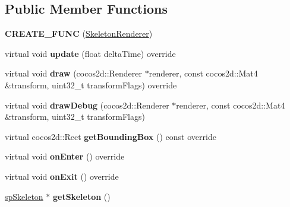 \subsection*{Public Member Functions}
\begin{DoxyCompactItemize}
\item 
\mbox{\label{classspine_1_1SkeletonRenderer_ab3f3c368717683a4967207db7c73ce16}} 
{\bfseries C\+R\+E\+A\+T\+E\+\_\+\+F\+U\+NC} (\hyperlink{classspine_1_1SkeletonRenderer}{Skeleton\+Renderer})
\item 
\mbox{\label{classspine_1_1SkeletonRenderer_afd1503d1b1a8b6867c228871ab52fcf4}} 
virtual void {\bfseries update} (float delta\+Time) override
\item 
\mbox{\label{classspine_1_1SkeletonRenderer_a69b1f548663e94bec846d072a519de4c}} 
virtual void {\bfseries draw} (cocos2d\+::\+Renderer $\ast$renderer, const cocos2d\+::\+Mat4 \&transform, uint32\+\_\+t transform\+Flags) override
\item 
\mbox{\label{classspine_1_1SkeletonRenderer_a80e09cce49af3a3b3f431d5a4080e81d}} 
virtual void {\bfseries draw\+Debug} (cocos2d\+::\+Renderer $\ast$renderer, const cocos2d\+::\+Mat4 \&transform, uint32\+\_\+t transform\+Flags)
\item 
\mbox{\label{classspine_1_1SkeletonRenderer_adbb3c0656581dde20b82916797603421}} 
virtual cocos2d\+::\+Rect {\bfseries get\+Bounding\+Box} () const override
\item 
\mbox{\label{classspine_1_1SkeletonRenderer_a134264a054a67b2893130ed3215cddf2}} 
virtual void {\bfseries on\+Enter} () override
\item 
\mbox{\label{classspine_1_1SkeletonRenderer_a160d3f8ebf7f63380b3a1b95da136024}} 
virtual void {\bfseries on\+Exit} () override
\item 
\mbox{\label{classspine_1_1SkeletonRenderer_a098b3aa06730bebd97942427e38280c1}} 
\hyperlink{structspSkeleton}{sp\+Skeleton} $\ast$ {\bfseries get\+Skeleton} ()

\end{DoxyCompactItemize}
